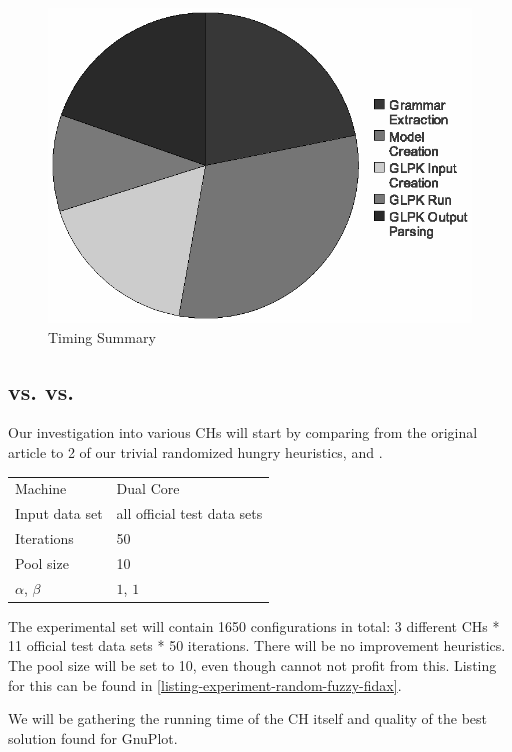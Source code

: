 \begin{figure}
  \caption{Timing Summary}
  \label{image-experiment-timing-summary}
  \centering
    \includegraphics[width=.6\textwidth]{images/experiments/timing-pie}
\end{figure}

\subsection{ vs.  vs. }


Our investigation into various CHs will start by comparing  from the original article \cite{fidax} to 2 of our trivial randomized hungry heuristics,  and .

\begin{center}
\bigskip
\begin{tabular}{| l | l |}
  \hline
  \hline
  Machine           & Dual Core \\
  Input data set    & all official test data sets \\
  Iterations        & 50 \\
  Pool size         & 10 \\
  $\alpha$, $\beta$ & $1$, $1$ \\
  \hline
\end{tabular}
\bigskip
\end{center}

The experimental set will contain 1650 configurations in total: 3 different CHs * 11 official test data sets * 50 iterations. There will be no improvement heuristics. The pool size will be set to 10, even though  cannot not profit from this. Listing for this can be found in \ref{listing-experiment-random-fuzzy-fidax}.

We will be gathering the running time of the CH itself and quality of the best solution found for GnuPlot.

